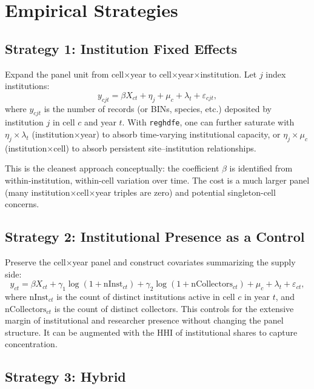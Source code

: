 \documentclass[10pt]{article}
\begin{document}
\section*{Empirical Strategies}

\subsection*{Strategy 1: Institution Fixed Effects}

Expand the panel unit from cell$\times$year to cell$\times$year$\times$institution. Let $j$ index institutions:
\begin{equation}
    y_{cjt} = \beta X_{ct} + \eta_j + \mu_c + \lambda_t + \varepsilon_{cjt},
\end{equation}
where $y_{cjt}$ is the number of records (or BINs, species, etc.) deposited by institution $j$ in cell $c$ and year $t$. With \texttt{reghdfe}, one can further saturate with $\eta_j \times \lambda_t$ (institution$\times$year) to absorb time-varying institutional capacity, or $\eta_j \times \mu_c$ (institution$\times$cell) to absorb persistent site--institution relationships.

This is the cleanest approach conceptually: the coefficient $\beta$ is identified from within-institution, within-cell variation over time. The cost is a much larger panel (many institution$\times$cell$\times$year triples are zero) and potential singleton-cell concerns.

\subsection*{Strategy 2: Institutional Presence as a Control}

Preserve the cell$\times$year panel and construct covariates summarizing the supply side:
\begin{equation}
    y_{ct} = \beta X_{ct} + \gamma_1 \log(1 + \text{nInst}_{ct}) + \gamma_2 \log(1 + \text{nCollectors}_{ct}) + \mu_c + \lambda_t + \varepsilon_{ct},
\end{equation}
where $\text{nInst}_{ct}$ is the count of distinct institutions active in cell $c$ in year $t$, and $\text{nCollectors}_{ct}$ is the count of distinct collectors. This controls for the extensive margin of institutional and researcher presence without changing the panel structure. It can be augmented with the HHI of institutional shares to capture concentration.

\subsection*{Strategy 3: Hybrid}
\end{document}
